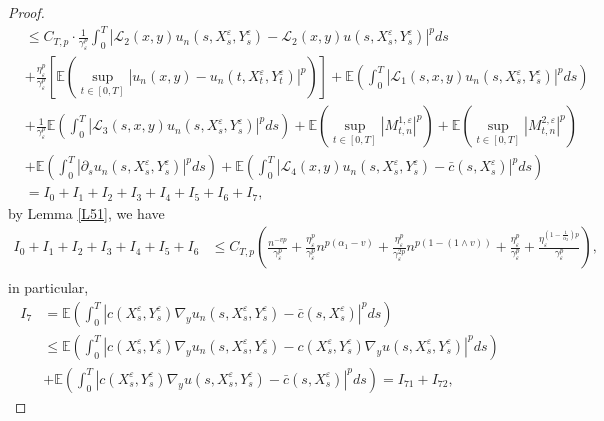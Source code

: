 \documentclass[11pt,reqno]{amsart}
\numberwithin{equation}{section}
\begin{document}
\begin{proof}
\begin{align}
		&\leq C_{T,p}\cdot\frac{1}{\gamma_{\varepsilon}^{p}}\int_{0}^{T}| \mathcal{L}_{2}(x,y)u_{n}(s,X_{s}^{\varepsilon},Y_{s}^{\varepsilon})-\mathcal{L}_{2}(x,y)u(s,X_{s}^{\varepsilon},Y_{s}^{\varepsilon})|^{p} ds\nonumber \\
		&+  \frac{\eta_{\varepsilon}^{p}}{\gamma_{\varepsilon}^{p}}\left[ \mathbb{E}\left( \sup_{t\in [0,T]}|u_{n}(x,y)-u_{n}(t,X_{t}^{\varepsilon},Y_{t}^{\varepsilon})|^{p}\right)\right] +\mathbb{E}\left( \int_{0}^{T}|\mathcal{L}_{1}(s,x,y)u_{n}(s,X_{s}^{\varepsilon},Y_{s}^{\varepsilon})|^{p}ds\right)\nonumber	\\
		&+\frac{1}{\gamma_{\varepsilon}^{p}}\mathbb{E}\left( \int_{0}^{T}|\mathcal{L}_{3}(s,x,y)u_{n}(s,X_{s}^{\varepsilon},Y_{s}^{\varepsilon})|^{p}ds\right)+\mathbb{E}\left( \sup_{t\in [0,T]}|M_{t,n}^{1,\varepsilon}|^{p}\right)+\mathbb{E}\left( \sup_{t\in [0,T]}|M_{t,n}^{2,\varepsilon}|^{p}\right)\nonumber\\
		&
		 + \mathbb{E}\left(  \int_{0}^{T}\left|\partial_{s}u_{n}(s,X_{s}^{\varepsilon},Y_{s}^{\varepsilon})\right|^{p}ds
		 \right) +\mathbb{E}\left( \int_{0}^{T}|\mathcal{L}_{4}(x,y)u_{n}(s,X_{s}^{\varepsilon},Y_{s}^{\varepsilon})- \bar{c}(s,X_{s}^{\varepsilon})|^{p}ds\right)\nonumber\\
		&=I_{0}+ I_{1}+I_{2}+I_{3}+I_{4}+I_{5}+I_{6}+I_{7},\label{5.65}
\end{align}
by Lemma \ref{L51}, we have 
\begin{equation}\label{5.66}
	\begin{aligned}
		I_{0}+I_{1}+I_{2}+I_{3}+I_{4}+I_{5}+I_{6}&\leq C_{T,p}\left( \frac{n^{-vp}}{\gamma_{\varepsilon}^{p}}+\frac{\eta_{\varepsilon}^{p}}{\gamma_{\varepsilon}^{p}}n^{p(\alpha_{1}-v)}+\frac{\eta_{\varepsilon}^{p}}{\gamma_{\varepsilon}^{2p}}n^{p(1-(1\wedge v))}+\frac{\eta_{\varepsilon}^{p}}{\gamma_{\varepsilon}^{p}}+\frac{\eta_{\varepsilon}^{(1-\frac{1}{\alpha_{2}})p}}{\gamma_{\varepsilon}^{p}} \right), \\
	\end{aligned}
\end{equation}
in particular,
\begin{equation}\label{5.67}
	\begin{split}
		I_{7}&=\mathbb{E}\left( \int^{T}_{0}|c(X_{s}^{\varepsilon},Y_{s}^{\varepsilon})\nabla_{y} u_{n}(s,X_{s}^{\varepsilon},Y_{s}^{\varepsilon})-\bar{c}(s,X_{s}^{\varepsilon})|^{p}ds\right) \\
		&\leq\mathbb{E}\left(  \int^{T}_{0}\left|c(X_{s}^{\varepsilon},Y_{s}^{\varepsilon})\nabla_{y} u_{n}(s,X_{s}^{\varepsilon},Y_{s}^{\varepsilon})-c(X_{s}^{\varepsilon},Y_{s}^{\varepsilon})\nabla_{y} u(s,X_{s}^{\varepsilon},Y_{s}^{\varepsilon})\right| ^{p}ds\right)\\ &+\mathbb{E}\left(  \int^{T}_{0}\left|c(X_{s}^{\varepsilon},Y_{s}^{\varepsilon})\nabla_{y} u(s,X_{s}^{\varepsilon},Y_{s}^{\varepsilon})-\bar{c}(s,X_{s}^{\varepsilon})\right|^{p}ds\right)=I_{71}+I_{72},

\end{split}
\end{equation}
\end{proof}
\end{document}
